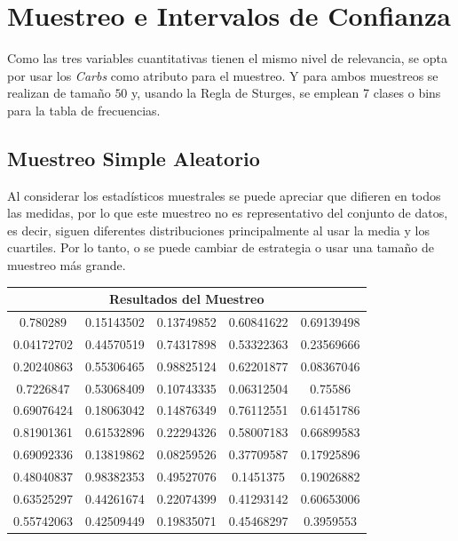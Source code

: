 \documentclass[12pt,a4paper]{article}
\begin{document}
    \newpage

    \section{Muestreo e Intervalos de Confianza}
    {
        Como las tres variables cuantitativas tienen el mismo nivel 
        de relevancia, se opta por usar los \emph{Carbs} como atributo 
        para el muestreo. Y para ambos muestreos se realizan de 
        tamaño $50$ y, usando la Regla de Sturges, se emplean 7 clases 
        o bins para la tabla de frecuencias.

        \subsection{Muestreo Simple Aleatorio}\label{subsec:sample_rand}
        {
            Al considerar los estadísticos muestrales se puede 
            apreciar que difieren en todos las medidas, por lo que este muestreo 
            no es representativo del conjunto de datos, es decir, siguen diferentes 
            distribuciones principalmente al usar la media y los cuartiles. Por lo 
            tanto, o se puede cambiar de estrategia o usar una tamaño de muestreo 
            más grande.

            \begin{center}
                \begin{tabular}{ccccc}
                        \multicolumn{5}{c}{Resultados del Muestreo} \\ 
                    \midrule
                        0.780289 &   0.15143502 & 0.13749852 &  0.60841622 & 0.69139498 \\ 
                        0.04172702 & 0.44570519 & 0.74317898 & 0.53322363 & 0.23569666\\
                        0.20240863 & 0.55306465 & 0.98825124 &  0.62201877 & 0.08367046 \\ 
                        0.7226847 & 0.53068409 & 0.10743335 & 0.06312504 & 0.75586 \\
                        0.69076424 & 0.18063042 & 0.14876349 &  0.76112551 & 0.61451786 \\ 
                        0.81901361 & 0.61532896 & 0.22294326 & 0.58007183 & 0.66899583\\
                        0.69092336 & 0.13819862 & 0.08259526 &  0.37709587 & 0.17925896 \\ 
                        0.48040837 & 0.98382353 & 0.49527076 & 0.1451375 &  0.19026882\\
                        0.63525297 & 0.44261674 & 0.22074399 &  0.41293142 & 0.60653006 \\ 
                        0.55742063 & 0.42509449 & 0.19835071 & 0.45468297 & 0.3959553\\
                \end{tabular}
            \end{center}

}}
\end{document}

